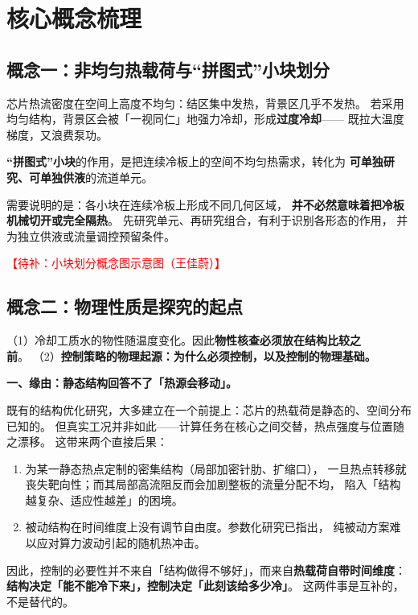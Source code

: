 \documentclass[stage1,fontset=fandol]{ydzjreport}
\begin{document}
	\section{核心概念梳理}
	
	\subsection{概念一：非均匀热载荷与“拼图式”小块划分}
	
	芯片热流密度在空间上高度不均匀：结区集中发热，背景区几乎不发热。
	若采用均匀结构，背景区会被「一视同仁」地强力冷却，形成\textbf{过度冷却}——
	既拉大温度梯度，又浪费泵功。
	
	\textbf{“拼图式”小块}的作用，是把连续冷板上的空间不均匀热需求，转化为
	\textbf{可单独研究、可单独供液}的流道单元。
	
	需要说明的是：各小块在连续冷板上形成不同几何区域，
	\textbf{并不必然意味着把冷板机械切开或完全隔热}。
	先研究单元、再研究组合，有利于识别各形态的作用，
	并为独立供液或流量调控预留条件。
	
	\textcolor{red}{【待补：小块划分概念图示意图（王佳蔚）】}
	
	\subsection{概念二：物理性质是探究的起点}
	
	（1）冷却工质水的物性随温度变化。因此\textbf{物性核查必须放在结构比较之前}。
	（2）\textbf{控制策略的物理起源：为什么必须控制，以及控制的物理基础。}
	
	\textbf{一、缘由：静态结构回答不了「热源会移动」。}
	
	既有的结构优化研究，大多建立在一个前提上：芯片的热载荷是静态的、空间分布已知的。
	但真实工况并非如此——计算任务在核心之间交替，热点强度与位置随之漂移\cite{wu,ji}。
	这带来两个直接后果：
	
	\begin{enumerate}
		\item 为某一静态热点定制的密集结构（局部加密针肋、扩缩口），
		一旦热点转移就丧失靶向性；而其局部高流阻反而会加剧整板的流量分配不均，
		陷入「结构越复杂、适应性越差」的困境。
		\item 被动结构在时间维度上没有调节自由度。参数化研究已指出，
		纯被动方案难以应对算力波动引起的随机热冲击\cite{laguna}。
	\end{enumerate}
	
	因此，控制的必要性并不来自「结构做得不够好」，而来自\textbf{热载荷自带时间维度}：
	\textbf{结构决定「能不能冷下来」，控制决定「此刻该给多少冷」}。
	这两件事是互补的，不是替代的。
	
\end{document}
